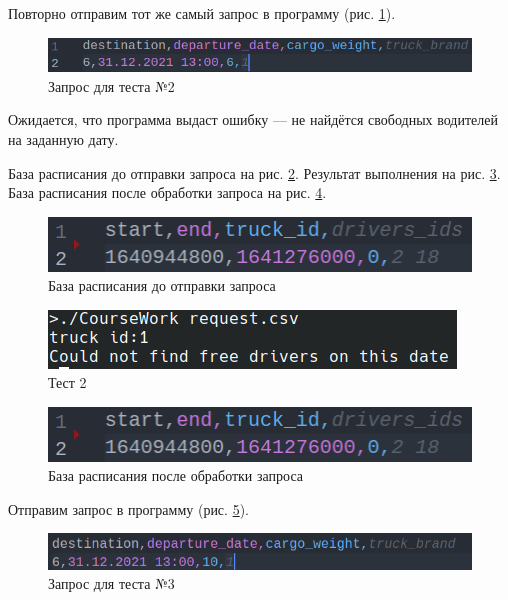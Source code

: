 Повторно отправим тот же самый запрос в программу (рис. \ref{request_1_again}).

\begin{figure}[H]
	\centering
	\includegraphics[width=0.7\linewidth]{photo/tests/user/request_1}
	\caption{Запрос для теста №2}
	\label{request_1_again}
\end{figure}

Ожидается, что программа выдаст ошибку --- 
не найдётся свободных водителей на заданную дату.

База расписания до отправки запроса на рис. \ref{schedule_db_21}.
Результат выполнения на рис. \ref{test_2}.
База расписания после обработки запроса на рис. \ref{schedule_db_22}.

\begin{figure}[H]
	\centering
	\includegraphics[width=0.7\linewidth]{photo/tests/user/schedule_db_test_1}
	\caption{База расписания до отправки запроса}
	\label{schedule_db_21}
\end{figure}

\begin{figure}[H]
	\centering
	\includegraphics[width=0.7\linewidth]{photo/tests/user/test_2}
	\caption{Тест 2}
	\label{test_2}
\end{figure}

\begin{figure}[H]
	\centering
	\includegraphics[width=0.7\linewidth]{photo/tests/user/schedule_db_test_1}
	\caption{База расписания после обработки запроса}
	\label{schedule_db_22}
\end{figure}

Отправим запрос в программу (рис. \ref{request_2}).

\begin{figure}[H]
	\centering
	\includegraphics[width=0.7\linewidth]{photo/tests/user/request_2}
	\caption{Запрос для теста №3}
	\label{request_2}
\end{figure}

